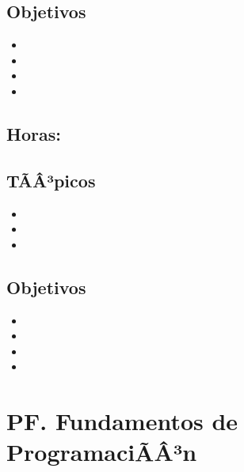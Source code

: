 \subsection*{Objetivos}
\begin{itemize}
	\item \DSCINCOObjUNO
	\item \DSCINCOObjDOS
	\item \DSCINCOObjTRES
	\item \DSCINCOObjCUATRO
\end{itemize}

\subsection{\DSSEISDef}\label{sec:BOK-DS6}
\subsection*{Horas: \DSSEISHours}

\subsection*{TÃÂ³picos}
\begin{itemize}
	\item \DSSEISTopicEspacios
	\item \DSSEISTopicProbabilidad
	\item \DSSEISTopicVariables
\end{itemize}

\subsection*{Objetivos}
\begin{itemize}
	\item \DSSEISObjUNO
	\item \DSSEISObjDOS
	\item \DSSEISObjTRES
	\item \DSSEISObjCUATRO
\end{itemize}

\section{PF. Fundamentos de ProgramaciÃÂ³n}\label{sec:BOK-PF}

\subsection{\PFUNODef}\label{sec:BOK-PF1}
